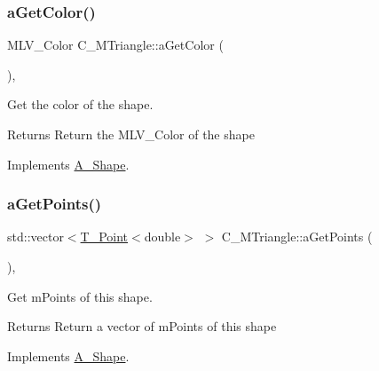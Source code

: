 \subsubsection{\texorpdfstring{a\+Get\+Color()}{aGetColor()}\hspace{0.1cm}{\footnotesize\ttfamily [2/2]}}
{\footnotesize\ttfamily M\+L\+V\+\_\+\+Color C\+\_\+\+M\+Triangle\+::a\+Get\+Color (\begin{DoxyParamCaption}{ }\end{DoxyParamCaption})\hspace{0.3cm}{\ttfamily [override]}, {\ttfamily [virtual]}}



Get the color of the shape. 

\begin{DoxyReturn}{Returns}
Return the M\+L\+V\+\_\+\+Color of the shape 
\end{DoxyReturn}


Implements \hyperlink{classA__Shape_a1e90c8132d33e4ac84d42f72606193b2}{A\+\_\+\+Shape}.

\mbox{\label{classC__MTriangle_a3bf9bf8a23a318376e505f76089037b4}} 
\subsubsection{\texorpdfstring{a\+Get\+Points()}{aGetPoints()}\hspace{0.1cm}{\footnotesize\ttfamily [1/2]}}
{\footnotesize\ttfamily std\+::vector$<$\hyperlink{classT__Point}{T\+\_\+\+Point}$<$double$>$ $>$ C\+\_\+\+M\+Triangle\+::a\+Get\+Points (\begin{DoxyParamCaption}{ }\end{DoxyParamCaption})\hspace{0.3cm}{\ttfamily [override]}, {\ttfamily [virtual]}}



Get m\+Points of this shape. 

\begin{DoxyReturn}{Returns}
Return a vector of m\+Points of this shape 
\end{DoxyReturn}


Implements \hyperlink{classA__Shape_a9fd1285bd63b1fc88943c9969bf01a5c}{A\+\_\+\+Shape}.

\mbox{\label{classC__MTriangle_ada409f8f1015cf7bf9f9ab8fb11da94b}} 
